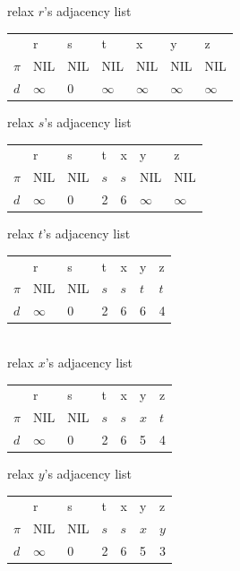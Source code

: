 \documentclass[]{memoir}
\begin{document}
\begin{enumerate}
relax $r$'s adjacency list
\begin{table}[h]
\begin{tabular}{l|l|l|l|l|l|l}
      & r        & s        & t        & x        & y        & z   \\
$\pi$ & NIL      & NIL      & NIL      & NIL      & NIL      & NIL \\
$d$   & $\infty$ & 0        & $\infty$ & $\infty$ & $\infty$ & $\infty$
\end{tabular}
\end{table}

relax $s$'s adjacency list
\begin{table}[h]
\begin{tabular}{l|l|l|l|l|l|l}
      & r        & s        & t   & x   & y        & z   \\
$\pi$ & NIL      & NIL      & $s$ & $s$ & NIL      & NIL \\
$d$   & $\infty$ & 0        & 2   & 6   & $\infty$ & $\infty$
\end{tabular}
\end{table}

relax $t$'s adjacency list
\begin{table}[h]
\begin{tabular}{l|l|l|l|l|l|l}
      & r        & s        & t   & x   & y   & z   \\
$\pi$ & NIL      & NIL      & $s$ & $s$ & $t$ & $t$ \\
$d$   & $\infty$ & 0        & 2   & 6   & 6   & 4
\end{tabular}
\end{table}
\pagebreak\\
relax $x$'s adjacency list
\begin{table}[h]
\begin{tabular}{l|l|l|l|l|l|l}
      & r        & s        & t   & x   & y   & z   \\
$\pi$ & NIL      & NIL      & $s$ & $s$ & $x$ & $t$ \\
$d$   & $\infty$ & 0        & 2   & 6   & 5   & 4
\end{tabular}
\end{table}

relax $y$'s adjacency list
\begin{table}[h]
\begin{tabular}{l|l|l|l|l|l|l}
      & r        & s        & t   & x   & y   & z   \\
$\pi$ & NIL      & NIL      & $s$ & $s$ & $x$ & $y$ \\
$d$   & $\infty$ & 0        & 2   & 6   & 5   & 3
\end{tabular}
\end{table}


\end{enumerate}
\end{document}
